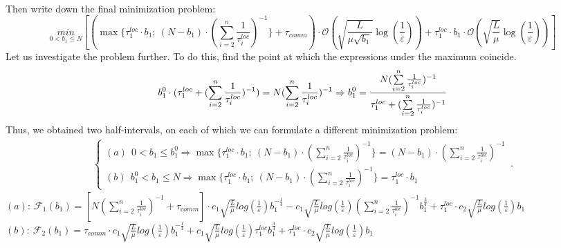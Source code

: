 \documentclass{article}
\begin{document}
\\ Then write down the final minimization problem:
\begin{equation}
     \label{eq:fm2}
    \underset{0 < b_1 \leq N}{min}[(\max\{\tau_1^{loc}\cdot b_1; ~(N-b_1) \cdot (\sum\limits_{i = 2}^{n} \frac{1}{\tau_i^{loc}} )^{-1}\} + \tau_{comm}) \cdot \mathcal O(\sqrt{\frac{L}{\mu \sqrt{b_1}}}\log(\frac{1}{\varepsilon})) + \tau_1^{loc}\cdot b_1 \cdot \mathcal O(\sqrt{\frac{L}{\mu}}\log(\frac{1}{\varepsilon}))] 
\end{equation}
Let us investigate the problem further. To do this, find the point at which the expressions under the maximum coincide. 
\begin{equation}
    \notag
    b_1^0 \cdot (\tau_1^{loc} + (\sum\limits_{i = 2}^{n} \frac{1}{\tau_i^{loc}})^{-1}) = N (\sum\limits_{i = 2}^{n} \frac{1}{\tau_i^{loc}})^{-1} \Rightarrow b_1^0 = \frac{N (\sum\limits_{i = 2}^{n} \frac{1}{\tau_i^{loc}})^{-1}}{\tau_1^{loc} + (\sum\limits_{i = 2}^{n} \frac{1}{\tau_i^{loc}})^{-1}}
\end{equation}
Thus, we obtained two half-intervals, on each of which we can formulate a different minimization problem:
\begin{eqnarray}
\label{half-int}
    \begin{cases}
    (a) ~ ~ 0 < b_1 \leq b_1^0 \Rightarrow \max\{\tau_1^{loc}\cdot b_1; ~(N-b_1) \cdot (\sum\limits_{i = 2}^{n} \frac{1}{\tau_i^{loc}} )^{-1}\} = 
    (N-b_1) \cdot (\sum\limits_{i = 2}^{n} \frac{1}{\tau_i^{loc}})^{-1}
    \\
    (b) ~ ~ b_1^0 <  b_1 \leq N \Rightarrow \max\{\tau_1^{loc}\cdot b_1; ~(N-b_1) \cdot (\sum\limits_{i = 2}^{n} \frac{1}{\tau_i^{loc}} )^{-1}\} = \tau_1^{loc}\cdot b_1
    \end{cases}\,.
\end{eqnarray}
$(a): ~\mathcal{F}_1(b_1) = [N (\sum\limits_{i = 2}^{n} \frac{1}{\tau_i^{loc}})^{-1} + \tau_{comm}]\cdot 
c_1 \sqrt{\frac{L}{\mu}}log (\frac{1}{\varepsilon})  b_1^{-\frac{1}{4}} - 
c_1  \sqrt{\frac{L}{\mu}}log (\frac{1}{\varepsilon})(\sum\limits_{i =
2}^{n} \frac{1}{\tau_i^{loc}})^{-1} b_1^{\frac{3}{4}}  + \tau_1^{loc}\cdot c_2  \sqrt{\frac{L}{\mu}}log (\frac{1}{\varepsilon}) b_1 $\\
$(b): ~\mathcal{F}_2(b_1) = \tau_{comm}\cdot 
c_1 \sqrt{\frac{L}{\mu}}log (\frac{1}{\varepsilon})  b_1^{-\frac{1}{4}} + 
c_1  \sqrt{\frac{L}{\mu}}log (\frac{1}{\varepsilon})\tau_1^{loc} b_1^{\frac{3}{4}}  + \tau_1^{loc}\cdot c_2  \sqrt{\frac{L}{\mu}}log (\frac{1}{\varepsilon}) b_1 $\\
\end{document}
